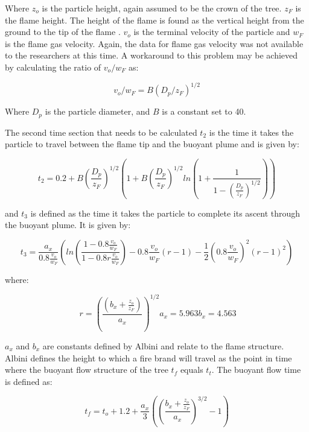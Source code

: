 Where $z_o$ is the particle height, again assumed to be the crown of the tree. $z_F$ is the flame height. The height of the flame is found as the vertical height from the ground to the tip of the flame \cite{firebehaveref}. $v_o$ is the terminal velocity of the particle and $w_F$ is the flame gas velocity. Again, the data for flame gas velocity was not available to the researchers at this time. A workaround to this problem may be achieved by calculating the ratio of $v_o / w_F$ as:  

\begin{equation}
v_o/w_F = B(D_p/z_F)^{1/2}
\end{equation}

Where $D_p$ is the particle diameter, and $B$ is a constant set to 40. 

The second time section that needs to be calculated $t_2$ is the time it takes the particle to travel between the flame tip and the buoyant plume and is given by: 

\begin{equation}
t_2 = 0.2 + B(\frac{D_p}{z_F})^{1/2}(1 + B(\frac{D_p}{z_F})^{1/2}ln(1 + \frac{1}{1-(\frac{D_p}{z_F})^{1/2}}))
\end{equation}

and $t_3$ is defined as the time it takes the particle to complete its ascent through the buoyant plume. It is given by: 

\begin{equation}
t_3 = \frac{a_x}{0.8\frac{v_o}{w_F}}(ln(\frac{1 - 0.8 \frac{v_o}{w_F}}{1 - 0.8r \frac{v_o}{w_F}}) - 0.8\frac{v_o}{w_F}(r-1) - \frac{1}{2}(0.8\frac{v_o}{w_F})^2(r-1)^2)
\end{equation}

where: 

\begin{equation}\
r = (\frac{(b_x + \frac{z_o}{z_F})}{a_x})^{1/2}
a_x = 5.963
b_x = 4.563
\end{equation}

$a_x$ and $b_x$ are constants defined by Albini \cite{albini} and relate to the flame structure. Albini defines the height to which a fire brand will travel as the point in time where the buoyant flow structure of the tree $t_f$ equals $t_t$. The buoyant flow time is defined as: 

\begin{equation}
t_f = t_o + 1.2 + \frac{a_x}{3}((\frac{b_x + \frac{z_o}{z_F}}{a_x})^{3/2} - 1)
\end{equation}

